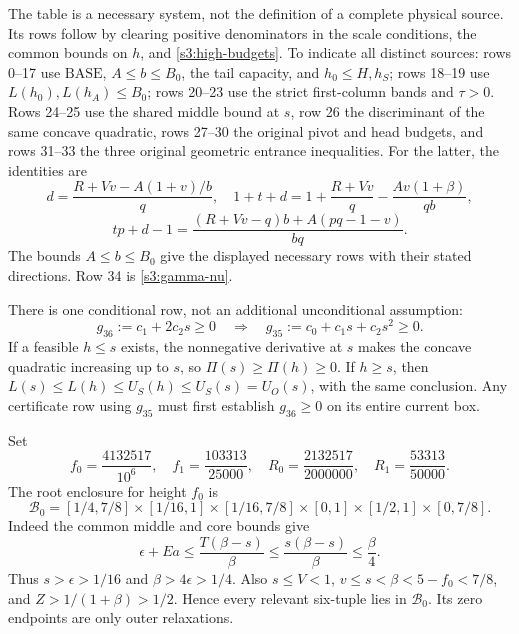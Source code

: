 \documentclass[11pt,reqno]{amsart}
\theoremstyle{definition}
\theoremstyle{remark}
\begin{document}
The table is a necessary system, not the definition of a complete
physical source. Its rows follow by clearing positive denominators
in the scale conditions, the common bounds on \(h\), and
\eqref{s3:high-budgets}. To indicate all distinct sources: rows
0--17 use \(\mathrm{BASE}\), \(A\le b\le B_0\), the tail
capacity, and \(h_0\le H,h_S\); rows 18--19 use
\(L(h_0),L(h_A)\le B_0\); rows 20--23 use the strict first-column
bands and \(\tau>0\). Rows 24--25 use the shared middle bound at
\(s\), row 26 the discriminant of the same concave quadratic,
rows 27--30 the original pivot and head budgets, and rows 31--33
the three original geometric entrance inequalities. For the latter,
the identities are
\[
 d=\frac{R+Vv-A(1+v)/b}{q},\quad
 1+t+d=1+\frac{R+Vv}{q}-\frac{Av(1+\beta)}{qb},
\]
\[
 tp+d-1=\frac{(R+Vv-q)b+A(pq-1-v)}{bq}.
\]
The bounds \(A\le b\le B_0\) give the displayed necessary rows
with their stated directions. Row 34 is \eqref{s3:gamma-nu}.

There is one conditional row, not an additional unconditional
assumption:
\begin{equation}\label{s3:conditional-guard}
 g_{36}:=c_1+2c_2s\ge0
 \quad\Longrightarrow\quad
 g_{35}:=c_0+c_1s+c_2s^2\ge0.
\end{equation}
If a feasible \(h\le s\) exists, the nonnegative derivative at
\(s\) makes the concave quadratic increasing up to \(s\), so
\(\Pi(s)\ge\Pi(h)\ge0\). If \(h\ge s\), then
\(L(s)\le L(h)\le U_S(h)\le U_S(s)=U_O(s)\), with the same
conclusion. Any certificate row using \(g_{35}\) must first
establish \(g_{36}\ge0\) on its entire current box.

Set
\begin{equation}\label{s3:target-interval}
 f_0=\frac{4132517}{10^6},\quad f_1=\frac{103313}{25000},
 \quad R_0=\frac{2132517}{2000000},\quad R_1=\frac{53313}{50000}.
\end{equation}
The root enclosure for height \(f_0\) is
\begin{equation}\label{s3:localization-root}
 \mathcal B_0=[1/4,7/8]\times[1/16,1]\times[1/16,7/8]
          \times[0,1]\times[1/2,1]\times[0,7/8].
\end{equation}
Indeed the common middle and core bounds give
\[
 \epsilon+Ea\le\frac{T(\beta-s)}\beta
                    \le\frac{s(\beta-s)}\beta\le\frac\beta4.
\]
Thus \(s>\epsilon>1/16\) and \(\beta>4\epsilon>1/4\).
Also \(s\le V<1\), \(v\le s<\beta<5-f_0<7/8\), and
\(Z>1/(1+\beta)>1/2\). Hence every relevant six-tuple lies in
\(\mathcal B_0\). Its zero endpoints are only outer relaxations.
\end{document}
